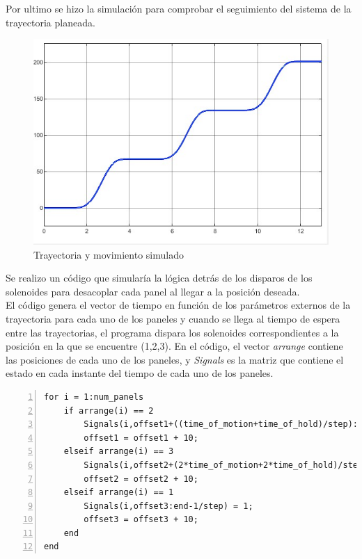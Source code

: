 \FloatBarrier
Por ultimo se hizo la simulación para comprobar el seguimiento del sistema de la trayectoria planeada.
\begin{figure}[!htb]
    \centering
    \includegraphics[width=1\textwidth]{imagenes/Trajectory.jpg}
    \caption{\footnotesize {Trayectoria y movimiento simulado}}
    \label{fig:Trajectory}
\end{figure}
\FloatBarrier
Se realizo un código que simularía la lógica detrás de los disparos de los solenoides para desacoplar cada panel al llegar a la posición deseada.\\ El código genera el vector de tiempo en función de los parámetros externos de la trayectoria para cada uno de los paneles y cuando se llega al tiempo de espera entre las trayectorias, el programa dispara los solenoides correspondientes a la posición en la que se encuentre (1,2,3). En el código, el vector \textit{arrange} contiene las posiciones de cada uno de los paneles, y \textit{Signals} es la matriz que contiene el estado en cada instante del tiempo de cada uno de los paneles.
\begin{lstlisting}[frame=single,numbers=left, style=Matlab-editor, basicstyle=\tiny]
for i = 1:num_panels
    if arrange(i) == 2
        Signals(i,offset1+((time_of_motion+time_of_hold)/step):end-1/step) = 1;
        offset1 = offset1 + 10;
    elseif arrange(i) == 3
        Signals(i,offset2+(2*time_of_motion+2*time_of_hold)/step:end-1/step) = 1;
        offset2 = offset2 + 10;
    elseif arrange(i) == 1
        Signals(i,offset3:end-1/step) = 1;
        offset3 = offset3 + 10;
    end   
end
\end{lstlisting}
